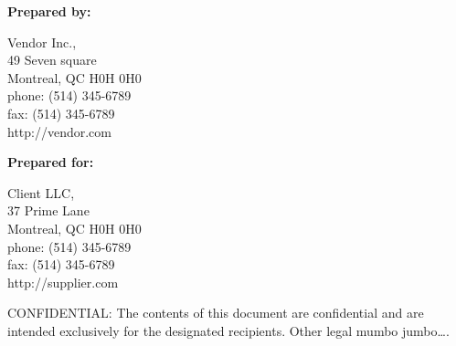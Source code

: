 \begin{titlingpage}
  \maketitle
  \vfill
\end{titlingpage}

\pagebreak

\textbf{Prepared by:}

Vendor Inc.,\\49 Seven square\\Montreal, QC H0H 0H0\\phone: (514)
345-6789\\fax: (514) 345-6789\\http://vendor.com

\textbf{}

\textbf{Prepared for:}

Client LLC,\\37 Prime Lane\\Montreal, QC H0H 0H0\\phone: (514)
345-6789\\fax: (514) 345-6789\\http://supplier.com

\vfill

CONFIDENTIAL: The contents of this document are confidential and are
intended exclusively for the designated recipients. Other legal mumbo
jumbo\ldots{}.

\pagebreak
